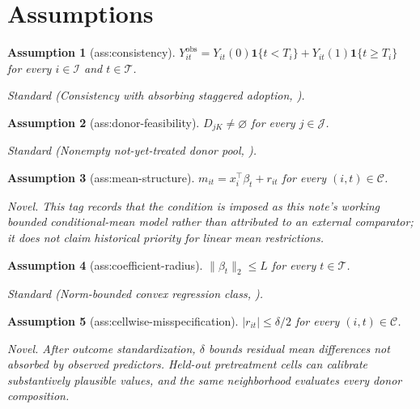 \documentclass{article}
\newtheorem{assumption}{Assumption}
\begin{document}
\section{Assumptions}

\begin{assumption}[ass:consistency]\label{ass:consistency}
\(Y^{\mathrm{obs}}_{it}=Y_{it}(0)\mathbf 1\{t<T_i\}+Y_{it}(1)\mathbf 1\{t\ge T_i\}\) for every \(i\in\mathcal I\) and \(t\in\mathcal T\).
\par\smallskip\noindent\emph{Standard} (Consistency with absorbing staggered adoption, \cite{BenMichaelFellerRothstein2022}).
\end{assumption}

\begin{assumption}[ass:donor-feasibility]\label{ass:donor-feasibility}
\(D_{jK}\ne\varnothing\) for every \(j\in\mathcal J\).
\par\smallskip\noindent\emph{Standard} (Nonempty not-yet-treated donor pool, \cite{BenMichaelFellerRothstein2022}).
\end{assumption}

\begin{assumption}[ass:mean-structure]\label{ass:mean-structure}
\(m_{it}=x_i^{\top}\beta_t+r_{it}\) for every \((i,t)\in\mathcal C\).
\par\smallskip\noindent\emph{Novel.} This tag records that the condition is imposed as this note's working bounded conditional-mean model rather than attributed to an external comparator; it does not claim historical priority for linear mean restrictions.
\end{assumption}

\begin{assumption}[ass:coefficient-radius]\label{ass:coefficient-radius}
\(\lVert\beta_t\rVert_2\le L\) for every \(t\in\mathcal T\).
\par\smallskip\noindent\emph{Standard} (Norm-bounded convex regression class, \cite{ArmstrongKolesar2018}).
\end{assumption}

\begin{assumption}[ass:cellwise-misspecification]\label{ass:cellwise-misspecification}
\(|r_{it}|\le\delta/2\) for every \((i,t)\in\mathcal C\).
\par\smallskip\noindent\emph{Novel.} After outcome standardization, \(\delta\) bounds residual mean differences not absorbed by observed predictors. Held-out pretreatment cells can calibrate substantively plausible values, and the same neighborhood evaluates every donor composition.
\end{assumption}
\end{document}
